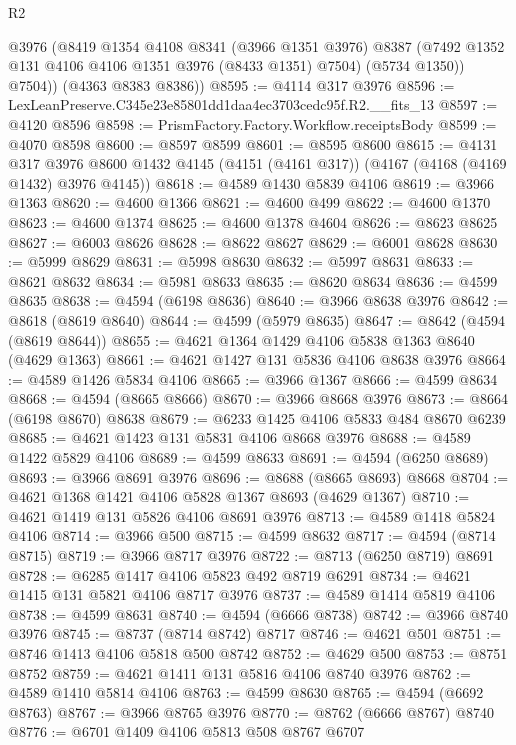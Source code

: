 \begin{lexlean}{R2}
\begin{coremodule}
          @3976
          (@8419
            @1354
            @4108
            @8341
            (@3966 @1351 @3976)
            @8387
            (@7492 @1352 @131 @4106 @4106 @1351 @3976 (@8433 @1351) @7504)
            (@5734 @1350))
          @7504))
      (@4363 @8383 @8386))
@8595 := @4114 @317 @3976
@8596 := LexLeanPreserve.C345e23e85801dd1daa4ec3703cedc95f.R2.__fits_13
@8597 := @4120 @8596
@8598 := PrismFactory.Factory.Workflow.receiptsBody
@8599 := @4070 @8598
@8600 := @8597 @8599
@8601 := @8595 @8600
@8615 := @4131
    @317
    @3976
    @8600
    @1432
    @4145
    (@4151 (@4161 @317))
    (@4167 (@4168 (@4169 @1432) @3976 @4145))
@8618 := @4589 @1430 @5839 @4106
@8619 := @3966 @1363
@8620 := @4600 @1366
@8621 := @4600 @499
@8622 := @4600 @1370
@8623 := @4600 @1374
@8625 := @4600 @1378 @4604
@8626 := @8623 @8625
@8627 := @6003 @8626
@8628 := @8622 @8627
@8629 := @6001 @8628
@8630 := @5999 @8629
@8631 := @5998 @8630
@8632 := @5997 @8631
@8633 := @8621 @8632
@8634 := @5981 @8633
@8635 := @8620 @8634
@8636 := @4599 @8635
@8638 := @4594 (@6198 @8636)
@8640 := @3966 @8638 @3976
@8642 := @8618 (@8619 @8640)
@8644 := @4599 (@5979 @8635)
@8647 := @8642 (@4594 (@8619 @8644))
@8655 := @4621 @1364 @1429 @4106 @5838 @1363 @8640 (@4629 @1363)
@8661 := @4621 @1427 @131 @5836 @4106 @8638 @3976
@8664 := @4589 @1426 @5834 @4106
@8665 := @3966 @1367
@8666 := @4599 @8634
@8668 := @4594 (@8665 @8666)
@8670 := @3966 @8668 @3976
@8673 := @8664 (@6198 @8670) @8638
@8679 := @6233 @1425 @4106 @5833 @484 @8670 @6239
@8685 := @4621 @1423 @131 @5831 @4106 @8668 @3976
@8688 := @4589 @1422 @5829 @4106
@8689 := @4599 @8633
@8691 := @4594 (@6250 @8689)
@8693 := @3966 @8691 @3976
@8696 := @8688 (@8665 @8693) @8668
@8704 := @4621 @1368 @1421 @4106 @5828 @1367 @8693 (@4629 @1367)
@8710 := @4621 @1419 @131 @5826 @4106 @8691 @3976
@8713 := @4589 @1418 @5824 @4106
@8714 := @3966 @500
@8715 := @4599 @8632
@8717 := @4594 (@8714 @8715)
@8719 := @3966 @8717 @3976
@8722 := @8713 (@6250 @8719) @8691
@8728 := @6285 @1417 @4106 @5823 @492 @8719 @6291
@8734 := @4621 @1415 @131 @5821 @4106 @8717 @3976
@8737 := @4589 @1414 @5819 @4106
@8738 := @4599 @8631
@8740 := @4594 (@6666 @8738)
@8742 := @3966 @8740 @3976
@8745 := @8737 (@8714 @8742) @8717
@8746 := @4621 @501
@8751 := @8746 @1413 @4106 @5818 @500 @8742
@8752 := @4629 @500
@8753 := @8751 @8752
@8759 := @4621 @1411 @131 @5816 @4106 @8740 @3976
@8762 := @4589 @1410 @5814 @4106
@8763 := @4599 @8630
@8765 := @4594 (@6692 @8763)
@8767 := @3966 @8765 @3976
@8770 := @8762 (@6666 @8767) @8740
@8776 := @6701 @1409 @4106 @5813 @508 @8767 @6707

\end{coremodule}
\end{lexlean}
